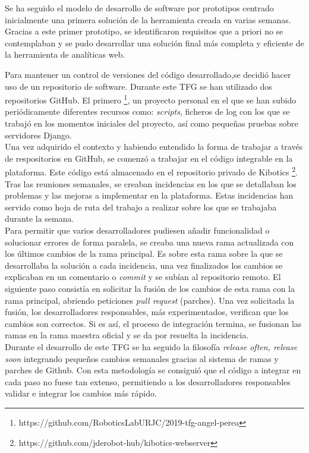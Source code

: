 \documentclass[a4paper, 12pt]{book}
\begin{document}
		Se ha seguido el modelo de desarrollo de software por prototipos centrado inicialmente una primera solución de la herramienta creada en varias semanas. Gracias a este primer prototipo, se identificaron requisitos que a priori no se contemplaban y se pudo desarrollar una solución final más completa y eficiente de la herramienta de analíticas web.
		
		Para mantener un control de versiones del código desarrollado,se decidió hacer uso de un repositorio de software. Durante este TFG se han utilizado dos repositorios GitHub. El primero \footnote{https://github.com/RoboticsLabURJC/2019-tfg-angel-perea}, un proyecto personal en el que se han subido periódicamente diferentes recursos como: \textit{scripts}, ficheros de log con los que se trabajó en los momentos iniciales del proyecto, así como pequeñas pruebas sobre servidores Django. \\
		
		Una vez adquirido el contexto y habiendo entendido la forma de trabajar a través de respositorios en GitHub, se comenzó a trabajar en el código integrable en la plataforma. Este código está almacenado en el repositorio privado de Kibotics \footnote{https://github.com/jderobot-hub/kibotics-webserver}. Tras las reuniones semanales, se creaban incidencias en los que se detallaban los problemas y las mejoras a implementar en la plataforma. Estas incidencias han servido como hoja de ruta del trabajo a realizar sobre los que se trabajaba durante la semana. \\
		
		Para permitir que varios desarrolladores pudiesen añadir funcionalidad o solucionar errores de forma paralela, se creaba una nueva rama actualizada con los últimos cambios de la rama principal. Es sobre esta rama sobre la que se desarrollaba la solución a cada incidencia, una vez finalizados los cambios se explicaban en un comentario o \textit{commit} y se subían al repositorio remoto. El siguiente paso consistía en solicitar la fusión de los cambios de esta rama con la rama principal, abriendo peticiones \textit{pull request} (parches). Una vez solicitada la fusión, los desarrolladores responsables, más experimentados, verifican que los cambios son correctos. Si es así, el proceso de integración termina, se fusionan las ramas en la rama maestra oficial y se da por resuelta la incidencia. \\
		
		Durante el desarrollo de este TFG se ha seguido la filosofía \textit{release often, release soon} integrando pequeños cambios semanales gracias al sistema de ramas y parches de Github. Con esta metodología se consiguió que el código a integrar en cada paso no fuese tan extenso, permitiendo a los desarrolladores responsables validar e integrar los cambios más rápido.\\
		
\end{document}
